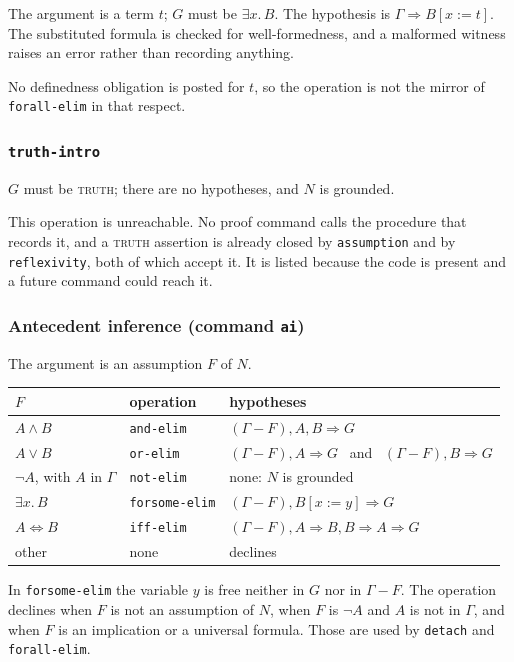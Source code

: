 The argument is a term $t$; $G$ must be $\exists x.\, B$.  The hypothesis
is $\Gamma \Longrightarrow B[x{:=}t]$.  The substituted formula is
checked for well-formedness, and a malformed witness raises an error
rather than recording anything.

No definedness obligation is posted for $t$, so the operation is not the
mirror of \texttt{forall-elim} in that respect.

\subsubsection*{\texttt{truth-intro}}

$G$ must be \textsc{truth}; there are no hypotheses, and $N$ is grounded.

This operation is unreachable.  No proof command calls the procedure
that records it, and a \textsc{truth} assertion is already closed by
\texttt{assumption} and by \texttt{reflexivity}, both of which accept it.
It is listed because the code is present and a future command could
reach it.

\subsubsection*{Antecedent inference (command \texttt{ai})}

The argument is an assumption $F$ of $N$.

\begin{center}
\begin{tabular}{@{}lll@{}}
\toprule
$F$ & operation & hypotheses \\
\midrule
$A \wedge B$ & \texttt{and-elim} & $(\Gamma - F), A, B \Longrightarrow G$ \\
$A \vee B$ & \texttt{or-elim} & $(\Gamma - F), A \Longrightarrow G$ \ and \ $(\Gamma - F), B \Longrightarrow G$ \\
$\neg A$, with $A$ in $\Gamma$ & \texttt{not-elim} & none: $N$ is grounded \\
$\exists x.\, B$ & \texttt{forsome-elim} & $(\Gamma - F), B[x{:=}y] \Longrightarrow G$ \\
$A \Leftrightarrow B$ & \texttt{iff-elim} & $(\Gamma - F), A \Rightarrow B, B \Rightarrow A \Longrightarrow G$ \\
other & none & declines \\
\bottomrule
\end{tabular}
\end{center}

In \texttt{forsome-elim} the variable $y$ is free neither in $G$ nor in
$\Gamma - F$.  The operation declines when $F$ is not an assumption of
$N$, when $F$ is $\neg A$ and $A$ is not in $\Gamma$, and when $F$ is an
implication or a universal formula.  Those are used by \texttt{detach}
and \texttt{forall-elim}.


